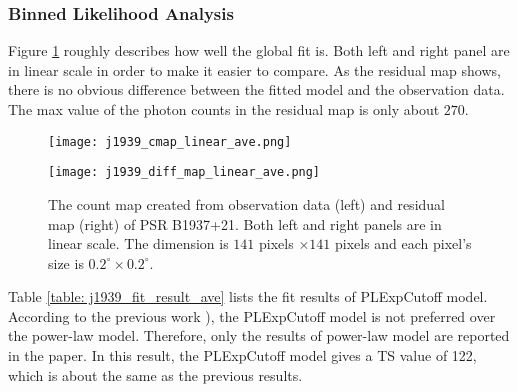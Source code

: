 \documentclass[12pt]{report}
\begin{document}
      \subsubsection{Binned Likelihood Analysis}
        Figure \ref{fig: j1939_count_map_diff_ave} roughly describes how well the global fit 
        is. Both left and right panel are in linear scale in order to make it easier to 
        compare. As the residual map shows, there is no obvious difference between the fitted 
        model and the observation data. The max value of the photon counts in the residual map 
        is only about $270$. 
        \begin{figure}[!ht]
          \begin{center}
          \begin{minipage}{0.45\textwidth}
            \begin{center} 
              \texttt{[image: j1939\_cmap\_linear\_ave.png]}
            \end{center}
          \end{minipage}
          \begin{minipage}{0.45\textwidth}
            \begin{center}
              \texttt{[image: j1939\_diff\_map\_linear\_ave.png]}
            \end{center}
          \end{minipage}
          \end{center}
            \caption{The count map created from observation data (left) and residual map (right)
              of PSR B1937+21. Both left and right panels are in linear scale. 
              The dimension is $141$ pixels $\times 141$ pixels and each pixel's 
              size is $0.2^{\circ}\times0.2^{\circ}$.}
            \label{fig: j1939_count_map_diff_ave}
        \end{figure}

        Table \ref{table: j1939_fit_result_ave} lists the fit results of PLExpCutoff model. 
        According to the previous work \citep{0004-637X-787-2-167}), 
        the PLExpCutoff model is not preferred over the power-law model. Therefore, only 
        the results of power-law model are reported in the paper. In this result, the 
        PLExpCutoff model gives a TS value of 122, which is about the same as the previous 
        results. 
\end{document}
